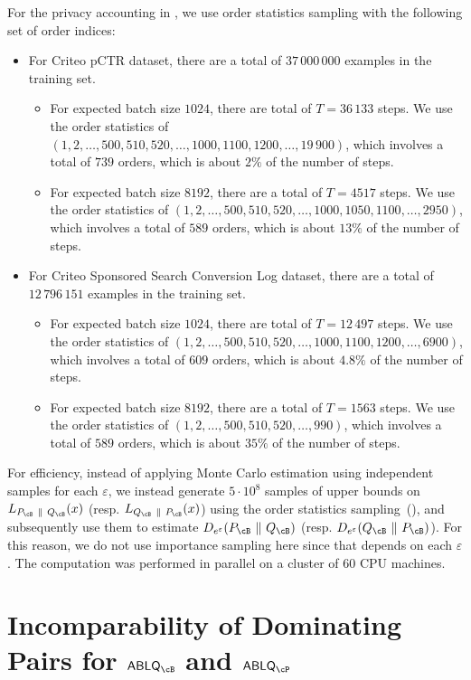 \documentclass[twoside]{article}
\theoremstyle{definition}
\newcommand{\eps}{\varepsilon}
\newcommand{\Deps}{D_{e^{\eps}}}
\newcommand{\ABLQ}{\mathsf{ABLQ}}
\newcommand{\ABLQP}{\ABLQ_{\cP}}
\newcommand{\ABLQB}{\ABLQ_{\cB}}
\newcommand{\PB}{P_{\cB}}
\newcommand{\QB}{Q_{\cB}}
\begin{document}
For the privacy accounting in , we use order statistics sampling with the following set of order indices:
\begin{itemize}
\item For Criteo pCTR dataset, there are a total of $37\,000\,000$ examples in the training set.
	\begin{itemize}[label=$\triangleright$]
	\item For expected batch size $1024$, there are total of $T = 36\,133$ steps. We use the order statistics of $(1, 2, \ldots, 500, 510, 520, \ldots, 1000, 1100, 1200, \ldots, 19\,900)$, which involves a total of $739$ orders, which is about $2\%$ of the number of steps.
	\item For expected batch size $8192$, there are a total of $T = 4517$ steps. We use the order statistics of $(1, 2, \ldots, 500, 510, 520, \ldots, 1000, 1050, 1100, \ldots, 2950)$, which involves a total of $589$ orders, which is about $13\%$ of the number of steps.
	\end{itemize}
\item For Criteo Sponsored Search Conversion Log dataset, there are a total of $12\,796\,151$ examples in the training set.
	\begin{itemize}[label=$\triangleright$]
	\item For expected batch size $1024$, there are total of $T = 12\,497$ steps. We use the order statistics of $(1, 2, \ldots, 500, 510, 520, \ldots, 1000, 1100, 1200, \ldots, 6900)$, which involves a total of $609$ orders, which is about $4.8\%$ of the number of steps.
	\item For expected batch size $8192$, there are a total of $T = 1563$ steps. We use the order statistics of $(1, 2, \ldots, 500, 510, 520, \ldots, 990)$, which involves a total of $589$ orders, which is about $35\%$ of the number of steps.
	\end{itemize}
\end{itemize}
For efficiency, instead of applying Monte Carlo estimation using independent samples for each $\eps$, we instead generate $5 \cdot 10^8$ samples of upper bounds on $L_{\PB ~\|~ \QB}(x)$ (resp. $L_{\QB ~\|~ \PB}(x)$) using the order statistics sampling~(), and subsequently use them to estimate $\Deps(\PB ~\|~ \QB)$ (resp. $\Deps(\QB ~\|~ \PB)$). For this reason, we do not use importance sampling here since that depends on each $\eps$. The computation was performed in parallel on a cluster of 60 CPU machines.

\section{\boldmath Incomparability of Dominating Pairs for \texorpdfstring{$\ABLQB$}{ABLQ\_B} and \texorpdfstring{$\ABLQP$}{ABLQ\_P}}\label{app:bnb-vs-poisson-incomparable}
\end{document}
